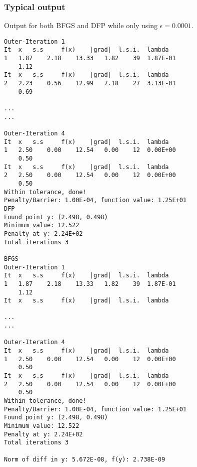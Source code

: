 \subsubsection{Typical output}
Output for both BFGS and DFP while only using $\epsilon=0.0001$.
\begin{verbatim}
Outer-Iteration 1
It 	x 	s.s 	f(x) 	|grad| 	l.s.i. 	lambda
1 	1.87 	2.18 	13.33 	1.82 	39 	1.87E-01
 	1.12
It 	x 	s.s 	f(x) 	|grad| 	l.s.i. 	lambda
2 	2.23 	0.56 	12.99 	7.18 	27 	3.13E-01
 	0.69
  
...
...

Outer-Iteration 4
It 	x 	s.s 	f(x) 	|grad| 	l.s.i. 	lambda
1 	2.50 	0.00 	12.54 	0.00 	12 	0.00E+00
 	0.50
It 	x 	s.s 	f(x) 	|grad| 	l.s.i. 	lambda
2 	2.50 	0.00 	12.54 	0.00 	12 	0.00E+00
 	0.50
Within tolerance, done!
Penalty/Barrier: 1.00E-04, function value: 1.25E+01
DFP
Found point y: (2.498, 0.498)
Minimum value: 12.522
Penalty at y: 2.24E+02
Total iterations 3

BFGS
Outer-Iteration 1
It 	x 	s.s 	f(x) 	|grad| 	l.s.i. 	lambda
1 	1.87 	2.18 	13.33 	1.82 	39 	1.87E-01
 	1.12
It 	x 	s.s 	f(x) 	|grad| 	l.s.i. 	lambda

...
...

Outer-Iteration 4
It 	x 	s.s 	f(x) 	|grad| 	l.s.i. 	lambda
1 	2.50 	0.00 	12.54 	0.00 	12 	0.00E+00
 	0.50
It 	x 	s.s 	f(x) 	|grad| 	l.s.i. 	lambda
2 	2.50 	0.00 	12.54 	0.00 	12 	0.00E+00
 	0.50
Within tolerance, done!
Penalty/Barrier: 1.00E-04, function value: 1.25E+01
Found point y: (2.498, 0.498)
Minimum value: 12.522
Penalty at y: 2.24E+02
Total iterations 3

Norm of diff in y: 5.672E-08, f(y): 2.738E-09
\end{verbatim}
